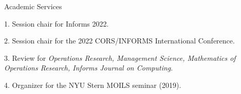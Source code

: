 \documentclass{resume} %
\begin{document}
\begin{rSection}{Academic Services}
\vspace{-0.3cm}
\item[1.] Session chair for Informs 2022.

\item[2.] Session chair for the 2022 CORS/INFORMS International Conference.

\item[3.] Review for \textit{Operations Research, Management Science, Mathematics of Operations Research, Informs Journal on Computing}.

\item[4.] Organizer for the NYU Stern MOILS seminar (2019).

\end{rSection}
\smallskip




\vspace{0.3cm}
\end{document}
